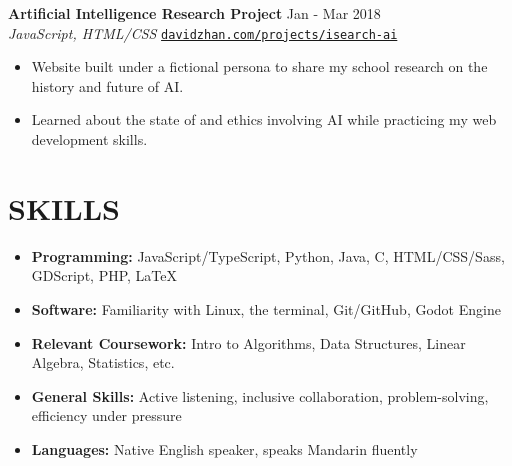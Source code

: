 \documentclass[letterpaper,10pt]{extarticle}
\begin{document}
\noindent
\textbf{Artificial Intelligence Research Project} \hfill Jan - Mar 2018 \\ %
\textit{JavaScript, HTML/CSS} \hfill \texttt{\href{https://davidzhan.com/projects/isearch-ai/}{davidzhan.com/projects/isearch-ai}}
\begin{itemize}
    \item Website built under a fictional persona to share my school research on the history and future of AI.
    \item Learned about the state of and ethics involving AI while practicing my web development skills.
\end{itemize}

\section*{SKILLS}
\begin{itemize}
    \item \textbf{Programming:} JavaScript/TypeScript, Python, Java, C, HTML/CSS/Sass, GDScript, PHP, {\selectfont \LaTeX}
    \item \textbf{Software:} Familiarity with Linux, the terminal, Git/GitHub, Godot Engine
    \item \textbf{Relevant Coursework:} Intro to Algorithms, Data Structures, Linear Algebra, Statistics, etc.
    \item \textbf{General Skills:} Active listening, inclusive collaboration, problem-solving, efficiency under pressure
    \item \textbf{Languages:} Native English speaker, speaks Mandarin fluently
\end{itemize}

\end{document}
